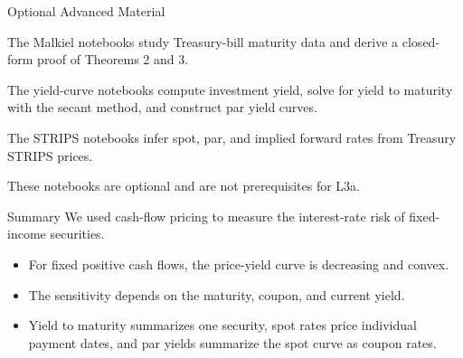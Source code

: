 \documentclass[aspectratio=169,11pt]{beamer}
\begin{document}
\begin{frame}{Optional Advanced Material}
  \vspace{0.2em}
  {\normalsize\textbf{} }

  The Malkiel notebooks study Treasury-bill maturity data and derive a
  closed-form proof of Theorems 2 and 3.

  \vspace{0.5em}
  {\normalsize\textbf{} }

  The yield-curve notebooks compute investment yield, solve for yield to maturity
  with the secant method, and construct par yield curves.

  \vspace{0.5em}
  {\normalsize\textbf{} }

  The STRIPS notebooks infer spot, par, and implied forward rates from Treasury
  STRIPS prices.

  \vspace{0.5em}
  These notebooks are optional and are not prerequisites for L3a.
\end{frame}

\begin{frame}{Summary}
  We used cash-flow pricing to measure the interest-rate risk of fixed-income
  securities.

  \vspace{0.45em}
  {\large\textbf{}}
  \vspace{0.2em}
  \begin{itemize}\setlength{\itemsep}{0.3em}
    \item \textbf{} For fixed
      positive cash flows, the price-yield curve is decreasing and convex.
    \item \textbf{}
      The sensitivity depends on the maturity, coupon, and current yield.
    \item \textbf{}
      Yield to maturity summarizes one security, spot rates price individual
      payment dates, and par yields summarize the spot curve as coupon rates.
  \end{itemize}
\end{frame}

\end{document}
